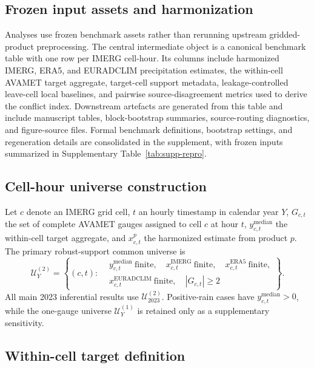 \documentclass[preprint,12pt]{elsarticle}
\begin{document}
\subsection{Frozen input assets and harmonization}

Analyses use frozen benchmark assets rather than rerunning upstream gridded-product preprocessing. The central intermediate object is a canonical benchmark table with one row per IMERG cell-hour. Its columns include harmonized IMERG, ERA5, and EURADCLIM precipitation estimates, the within-cell AVAMET target aggregate, target-cell support metadata, leakage-controlled leave-cell local baselines, and pairwise source-disagreement metrics used to derive the conflict index. Downstream artefacts are generated from this table and include manuscript tables, block-bootstrap summaries, source-routing diagnostics, and figure-source files. Formal benchmark definitions, bootstrap settings, and regeneration details are consolidated in the supplement, with frozen inputs summarized in Supplementary Table~\ref{tab:supp-repro}.

\subsection{Cell-hour universe construction}

Let \(c\) denote an IMERG grid cell, \(t\) an hourly timestamp in calendar year \(Y\), \(G_{c,t}\) the set of complete AVAMET gauges assigned to cell \(c\) at hour \(t\), \(y_{c,t}^{\mathrm{median}}\) the within-cell target aggregate, and \(x_{c,t}^{p}\) the harmonized estimate from product \(p\). The primary robust-support common universe is
\[
\mathcal{U}_{Y}^{(2)} =
\left\{(c,t):
\begin{aligned}
&y_{c,t}^{\mathrm{median}}\ \text{finite},\quad
x_{c,t}^{\mathrm{IMERG}}\ \text{finite},\quad
x_{c,t}^{\mathrm{ERA5}}\ \text{finite},\\
&x_{c,t}^{\mathrm{EURADCLIM}}\ \text{finite},\quad |G_{c,t}| \ge 2
\end{aligned}
\right\}.
\]
All main 2023 inferential results use \(\mathcal{U}_{2023}^{(2)}\). Positive-rain cases have \(y_{c,t}^{\mathrm{median}}>0\), while the one-gauge universe \(\mathcal{U}_{Y}^{(1)}\) is retained only as a supplementary sensitivity.

\subsection{Within-cell target definition}
\end{document}
